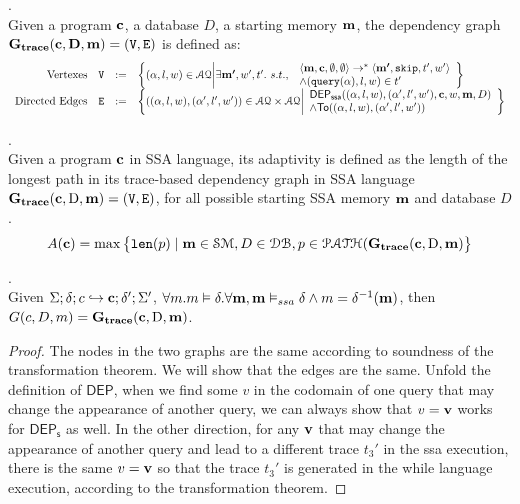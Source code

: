 \documentclass[a4paper,11pt]{article}
\begin{document}
%
%
\begin{defn}
.
\\
{
Given a program $\boldsymbol{\mathbf{c}}$, a database $D$, a starting memory $\boldsymbol{\mathbf{m}}$,
the dependency graph $\bf{G_{trace}}(\boldsymbol{\mathbf{c}},D,\boldsymbol{\mathbf{m}}) = (\mathtt{V}, \mathtt{E})$ is defined as: \\
\[
\begin{array}{rlcl}
	\text{Vertexes} &
	\vertxs & := & \left\{ 
	({\qval}, l,w) \in \mathcal{AQ} \middle\vert
	\exists \ssa{m'},  w', t'.  ~ s.t., ~  
	\begin{array}{l}
	\config{\ssa{m} ,\ssa{c}, \emptyset, \emptyset}  
	\to^{*}  
	\config{\ssa{m'} , \eskip, t', w' }
	\\ 
	\land (\query({\qval}), l, w) \in t'
	\end{array}
	\right\}
	\\
	\text{Directed Edges} &
	\edges & := & 
	\left\{ 
	(({\qval},l,w),({\qval}',l',w')) \in \mathcal{AQ} \times \mathcal{AQ} 
	\middle\vert
	\begin{array}{l}
		\mathsf{DEP_{ssa}}(({\qval},l,w), ({\qval}',l',w'),
		\ssa{c},w,\ssa{m},D) 
		\\ \land 
		\mathsf{To}(({\qval},l,w), ({\qval}',l',w'))
	\end{array}
	\right\}
\end{array}
\]
}
\end{defn}
%
\begin{defn}
.
\\
Given a program $\boldsymbol{\mathbf{c}}$ in SSA language, 
its adaptivity is defined as the length of the longest path in its trace-based dependency graph in SSA language 
$\bf{G_{trace}}(\boldsymbol{\mathbf{c}}, \text{D},\boldsymbol{\mathbf{m}}) = (\mathtt{V}, \mathtt{E})$, 
for all possible starting SSA memory $\boldsymbol{\mathbf{m}}$ and database $D$.
%
%
$$
A(\boldsymbol{\mathbf{c}}) = \max \big 
\{ \mathtt{len}(p) \mid \boldsymbol{\mathbf{m}} \in \mathcal{SM},D \in \mathcal{DB} ,p \in \mathcal{PATH}(\bf{G_{trace}}(\boldsymbol{\mathbf{c}}, \text{D}, \boldsymbol{\mathbf{m}}) \big \} 
$$
\end{defn}
%
%
\begin{thm}.
\\
{
Given $\Sigma; \delta ; c \hookrightarrow \boldsymbol{\mathbf{c}} ; \delta';\Sigma' $,
$\forall m. m \vDash \delta. \forall \boldsymbol{\mathbf{m}}, \boldsymbol{\mathbf{m}} \vDash_{ssa} \delta \land m = \delta^{-1}(\boldsymbol{\mathbf{m}})$, 
then $G(c,D,m) = \bf{G_{trace}}(\boldsymbol{\mathbf{c}}, \text{D},\boldsymbol{\mathbf{m}}) $.
}
\end{thm}
%
\begin{proof}
 The nodes in the two graphs are the same according to soundness of the transformation theorem. We will show that the edges are the same. Unfold the definition of $\mathsf{DEP}$, when we find some $v$ in the codomain of one query that may change the appearance of another query,  we can always show that $v = \boldsymbol{\mathbf{v}}$ works for $\mathsf{DEP_s}$ as well. In the other direction, for any $\boldsymbol{\mathbf{v}}$ that may change the appearance of another query and lead to a different trace $t_3'$ in the ssa execution, there is the same $v = \boldsymbol{\mathbf{v}}$ so that the trace $t_3'$ is generated in the while language execution, according to the transformation theorem.  
\end{proof}
\end{document}
